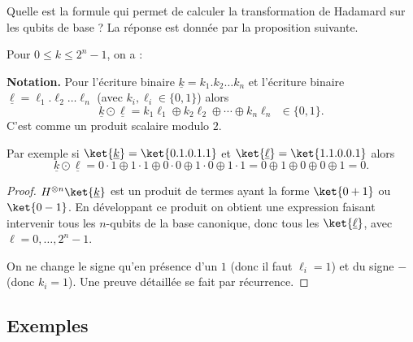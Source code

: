 \documentclass[11pt,class=report,crop=false]{standalone}
\begin{document}
Quelle est la formule qui permet de calculer la transformation de Hadamard sur les qubits de base ?
La réponse est donnée par la proposition suivante.

\begin{proposition}
Pour $0 \le k \le 2^{n}-1$, on a :
\end{proposition}

\textbf{Notation.}
Pour l'écriture binaire $\underline{k} = k_1.k_2 \ldots k_n$ et l'écriture binaire
$\underline{\ell} = \ell_1.\ell_2 \ldots \ell_n$ (avec $k_i,\ell_i \in \{0,1\}$) alors
$$\underline{k} \odot \underline{\ell} = k_1\ell_1 \oplus k_2\ell_2 \oplus \cdots \oplus k_n \ell_n \ \ \in \{0,1\}.$$
C'est comme un produit scalaire modulo $2$.

Par exemple si $\ket{\underline{k}} = \ket{0.1.0.1.1}$ et $\ket{\underline\ell} = \ket{1.1.0.0.1}$ alors 
$$\underline{k} \odot \underline{\ell} = 0\cdot1 \oplus 1\cdot1 \oplus 0\cdot0 \oplus 1\cdot 0 \oplus 1\cdot 1 = 0 \oplus 1 \oplus 0 \oplus 0 \oplus 1 = 0.$$

\begin{proof}
$H^{\otimes n} \ket{\underline{k}}$ est un produit de termes ayant la forme $\ket{0+1}$ ou $\ket{0-1}$.
En développant ce produit on obtient une expression faisant intervenir tous les $n$-qubits de la base canonique, donc tous les $\ket{\underline{\ell}}$, avec $\ell=0,\ldots,2^n-1$.

On ne change le signe qu'en présence d'un $1$ (donc il faut $\ell_i=1$) et du signe \og{}$-$\fg{} (donc $k_i=1$).
Une preuve détaillée se fait par récurrence.
\end{proof}


\subsection{Exemples}
\end{document}
